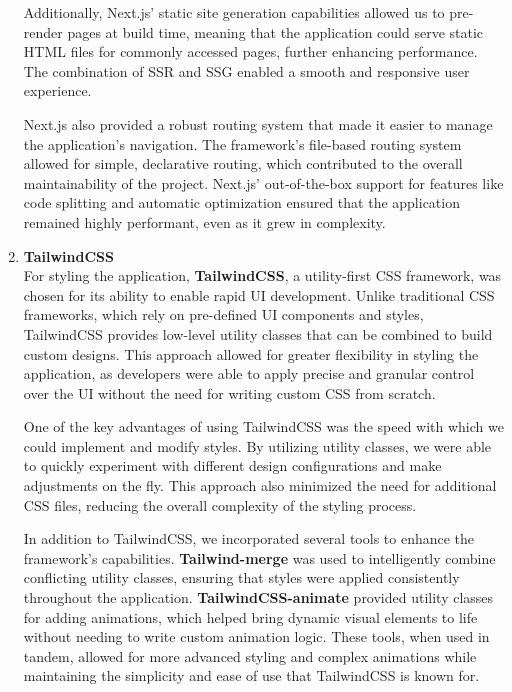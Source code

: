 \begin{enumerate}
    Additionally, Next.js’ static site generation capabilities allowed us to pre-render pages at build time, meaning that the application could serve static HTML files for commonly accessed pages, further enhancing performance. The combination of SSR and SSG enabled a smooth and responsive user experience.

    Next.js also provided a robust routing system that made it easier to manage the application’s navigation. The framework’s file-based routing system allowed for simple, declarative routing, which contributed to the overall maintainability of the project. Next.js’ out-of-the-box support for features like code splitting and automatic optimization ensured that the application remained highly performant, even as it grew in complexity. \\

    \item \textbf{TailwindCSS} \\
    For styling the application, \textbf{TailwindCSS}, a utility-first CSS framework, was chosen for its ability to enable rapid UI development. Unlike traditional CSS frameworks, which rely on pre-defined UI components and styles, TailwindCSS provides low-level utility classes that can be combined to build custom designs. This approach allowed for greater flexibility in styling the application, as developers were able to apply precise and granular control over the UI without the need for writing custom CSS from scratch.

    One of the key advantages of using TailwindCSS was the speed with which we could implement and modify styles. By utilizing utility classes, we were able to quickly experiment with different design configurations and make adjustments on the fly. This approach also minimized the need for additional CSS files, reducing the overall complexity of the styling process.

    In addition to TailwindCSS, we incorporated several tools to enhance the framework’s capabilities. \textbf{Tailwind-merge} was used to intelligently combine conflicting utility classes, ensuring that styles were applied consistently throughout the application. \textbf{TailwindCSS-animate} provided utility classes for adding animations, which helped bring dynamic visual elements to life without needing to write custom animation logic. These tools, when used in tandem, allowed for more advanced styling and complex animations while maintaining the simplicity and ease of use that TailwindCSS is known for.


\end{enumerate}
